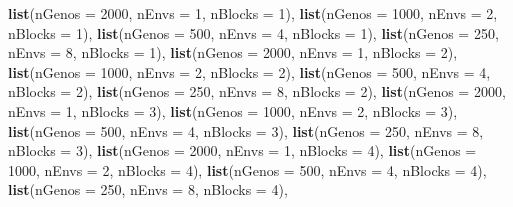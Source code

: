 \documentclass[
]{article}
\newenvironment{Shaded}{\begin{snugshade}}{\end{snugshade}}
\newcommand{\AttributeTok}[1]{\textcolor[rgb]{0.13,0.29,0.53}{#1}}
\newcommand{\DecValTok}[1]{\textcolor[rgb]{0.00,0.00,0.81}{#1}}
\newcommand{\FunctionTok}[1]{\textcolor[rgb]{0.13,0.29,0.53}{\textbf{#1}}}
\newcommand{\NormalTok}[1]{#1}
\begin{document}
\begin{Shaded}
\begin{Highlighting}[]
  \FunctionTok{list}\NormalTok{(}\AttributeTok{nGenos =} \DecValTok{2000}\NormalTok{, }\AttributeTok{nEnvs =} \DecValTok{1}\NormalTok{, }\AttributeTok{nBlocks =} \DecValTok{1}\NormalTok{),}
  \FunctionTok{list}\NormalTok{(}\AttributeTok{nGenos =} \DecValTok{1000}\NormalTok{, }\AttributeTok{nEnvs =} \DecValTok{2}\NormalTok{, }\AttributeTok{nBlocks =} \DecValTok{1}\NormalTok{),}
  \FunctionTok{list}\NormalTok{(}\AttributeTok{nGenos =} \DecValTok{500}\NormalTok{, }\AttributeTok{nEnvs =} \DecValTok{4}\NormalTok{, }\AttributeTok{nBlocks =} \DecValTok{1}\NormalTok{),}
  \FunctionTok{list}\NormalTok{(}\AttributeTok{nGenos =} \DecValTok{250}\NormalTok{, }\AttributeTok{nEnvs =} \DecValTok{8}\NormalTok{, }\AttributeTok{nBlocks =} \DecValTok{1}\NormalTok{),}
  \FunctionTok{list}\NormalTok{(}\AttributeTok{nGenos =} \DecValTok{2000}\NormalTok{, }\AttributeTok{nEnvs =} \DecValTok{1}\NormalTok{, }\AttributeTok{nBlocks =} \DecValTok{2}\NormalTok{),}
  \FunctionTok{list}\NormalTok{(}\AttributeTok{nGenos =} \DecValTok{1000}\NormalTok{, }\AttributeTok{nEnvs =} \DecValTok{2}\NormalTok{, }\AttributeTok{nBlocks =} \DecValTok{2}\NormalTok{),}
  \FunctionTok{list}\NormalTok{(}\AttributeTok{nGenos =} \DecValTok{500}\NormalTok{, }\AttributeTok{nEnvs =} \DecValTok{4}\NormalTok{, }\AttributeTok{nBlocks =} \DecValTok{2}\NormalTok{),}
  \FunctionTok{list}\NormalTok{(}\AttributeTok{nGenos =} \DecValTok{250}\NormalTok{, }\AttributeTok{nEnvs =} \DecValTok{8}\NormalTok{, }\AttributeTok{nBlocks =} \DecValTok{2}\NormalTok{),}
  \FunctionTok{list}\NormalTok{(}\AttributeTok{nGenos =} \DecValTok{2000}\NormalTok{, }\AttributeTok{nEnvs =} \DecValTok{1}\NormalTok{, }\AttributeTok{nBlocks =} \DecValTok{3}\NormalTok{),}
  \FunctionTok{list}\NormalTok{(}\AttributeTok{nGenos =} \DecValTok{1000}\NormalTok{, }\AttributeTok{nEnvs =} \DecValTok{2}\NormalTok{, }\AttributeTok{nBlocks =} \DecValTok{3}\NormalTok{),}
  \FunctionTok{list}\NormalTok{(}\AttributeTok{nGenos =} \DecValTok{500}\NormalTok{, }\AttributeTok{nEnvs =} \DecValTok{4}\NormalTok{, }\AttributeTok{nBlocks =} \DecValTok{3}\NormalTok{),}
  \FunctionTok{list}\NormalTok{(}\AttributeTok{nGenos =} \DecValTok{250}\NormalTok{, }\AttributeTok{nEnvs =} \DecValTok{8}\NormalTok{, }\AttributeTok{nBlocks =} \DecValTok{3}\NormalTok{),}
  \FunctionTok{list}\NormalTok{(}\AttributeTok{nGenos =} \DecValTok{2000}\NormalTok{, }\AttributeTok{nEnvs =} \DecValTok{1}\NormalTok{, }\AttributeTok{nBlocks =} \DecValTok{4}\NormalTok{),}
  \FunctionTok{list}\NormalTok{(}\AttributeTok{nGenos =} \DecValTok{1000}\NormalTok{, }\AttributeTok{nEnvs =} \DecValTok{2}\NormalTok{, }\AttributeTok{nBlocks =} \DecValTok{4}\NormalTok{),}
  \FunctionTok{list}\NormalTok{(}\AttributeTok{nGenos =} \DecValTok{500}\NormalTok{, }\AttributeTok{nEnvs =} \DecValTok{4}\NormalTok{, }\AttributeTok{nBlocks =} \DecValTok{4}\NormalTok{),}
  \FunctionTok{list}\NormalTok{(}\AttributeTok{nGenos =} \DecValTok{250}\NormalTok{, }\AttributeTok{nEnvs =} \DecValTok{8}\NormalTok{, }\AttributeTok{nBlocks =} \DecValTok{4}\NormalTok{),}
  

\end{Highlighting}
\end{Shaded}
\end{document}
